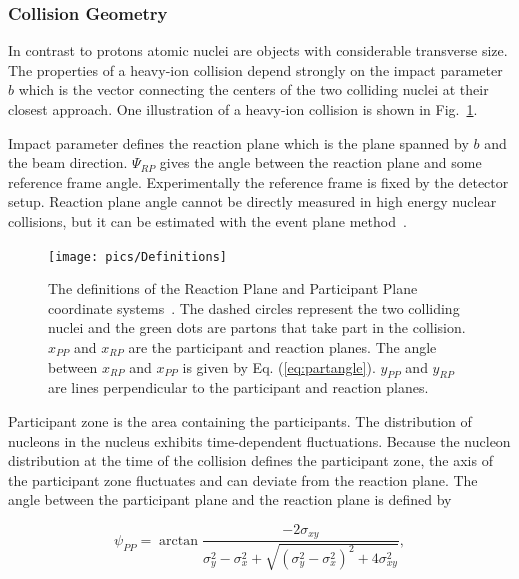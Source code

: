 \subsubsection{Collision Geometry}
In contrast to protons atomic nuclei are objects with considerable transverse size. The properties of a heavy-ion collision depend strongly on the impact parameter $b$ which is the vector connecting the centers of the two colliding nuclei at their closest approach. One illustration of a heavy-ion collision is shown in Fig.~\ref{fig:planes}.


Impact parameter defines the reaction plane which is the plane spanned by $b$ and the beam direction. $\Psi_{RP}$ gives the angle between the reaction plane and some reference frame angle. Experimentally the reference frame is fixed by the detector setup. Reaction plane angle cannot be directly measured in high energy nuclear collisions, but it can be estimated with the event plane method~\cite{Voloshin:2008dg}. 
\begin{figure}[h!]
\centering
\texttt{[image: pics/Definitions]}
\caption[The definitions of the Reaction Plane and Participant Plane coordinate systems]{The definitions of the Reaction Plane and Participant Plane coordinate systems~\cite{Voloshin:2007pc}. The dashed circles represent the two colliding nuclei and the green dots are partons that take part  in the collision. $x_{PP}$ and $x_{RP}$ are the participant and reaction planes. The angle between $x_{RP}$ and $x_{PP}$ is given by Eq. (\ref{eq:partangle}). $y_{PP}$ and $y_{RP}$ are lines perpendicular to the participant and reaction planes. }
\label{fig:planes}
\end{figure}


Participant zone is the area containing the participants. The distribution of nucleons in the nucleus exhibits time-dependent fluctuations. Because the nucleon distribution at the time of the collision defines the participant zone, the axis of the participant zone fluctuates and can deviate from the reaction plane. The angle between the participant plane and the reaction plane is defined by ~\cite{Holopainen:2010gz}

\begin{equation}
\psi_{PP}=\arctan \frac{-2\sigma_{xy}}{\sigma_y^2-\sigma_x^2+\sqrt{\left(\sigma_y^2-\sigma_x^2\right)^2+4\sigma_{xy}^2}},
\label{eq:partangle}
\end{equation}

